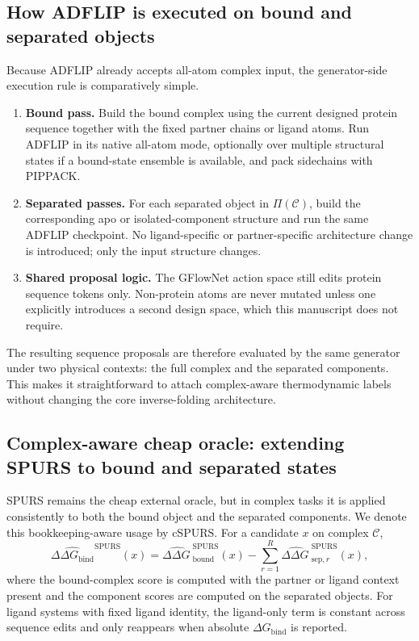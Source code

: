 \documentclass[11pt]{article}
\newcommand{\ddG}{\ensuremath{\Delta\Delta G \ }}
\newcommand{\DGbind}{\ensuremath{\Delta G_{\mathrm{bind}}}}
\newcommand{\ddGbind}{\ensuremath{\Delta\Delta G_{\mathrm{bind}}}}
\begin{document}
\subsection{How ADFLIP is executed on bound and separated objects}

Because ADFLIP already accepts all-atom complex input, the generator-side execution rule is comparatively simple.

\begin{enumerate}[leftmargin=1.5em]
    \item \textbf{Bound pass.} Build the bound complex using the current designed protein sequence together with the fixed partner chains or ligand atoms. Run ADFLIP in its native all-atom mode, optionally over multiple structural states if a bound-state ensemble is available, and pack sidechains with PIPPACK.
    \item \textbf{Separated passes.} For each separated object in $\Pi(\mathcal{C})$, build the corresponding apo or isolated-component structure and run the same ADFLIP checkpoint. No ligand-specific or partner-specific architecture change is introduced; only the input structure changes.
    \item \textbf{Shared proposal logic.} The GFlowNet action space still edits protein sequence tokens only. Non-protein atoms are never mutated unless one explicitly introduces a second design space, which this manuscript does not require.
\end{enumerate}

The resulting sequence proposals are therefore evaluated by the same generator under two physical contexts: the full complex and the separated components. This makes it straightforward to attach complex-aware thermodynamic labels without changing the core inverse-folding architecture.


\subsection{Complex-aware cheap oracle: extending SPURS to bound and separated states}

SPURS remains the cheap external oracle, but in complex tasks it is applied consistently to both the bound object and the separated components. We denote this bookkeeping-aware usage by cSPURS. For a candidate $x$ on complex $\mathcal{C}$,
\begin{equation}
\label{eq:spursbind_cx}
    \widehat{\ddGbind}^{\mathrm{SPURS}}(x)=\widehat{\ddG}^{\mathrm{SPURS}}_{\mathrm{bound}}(x)-\sum_{r=1}^{R}\widehat{\ddG}^{\mathrm{SPURS}}_{\mathrm{sep},r}(x),
\end{equation}
where the bound-complex score is computed with the partner or ligand context present and the component scores are computed on the separated objects. For ligand systems with fixed ligand identity, the ligand-only term is constant across sequence edits and only reappears when absolute \DGbind{} is reported.
\end{document}
